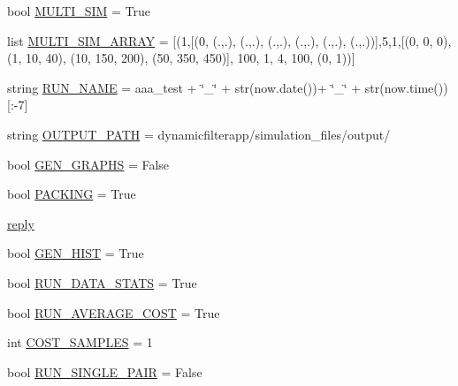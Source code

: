 \begin{DoxyCompactItemize}
\item 
bool \mbox{\hyperlink{namespacedynamicfilterapp_1_1toggles_a8822be27c516d0f027cff60d067b6d87}{M\+U\+L\+T\+I\+\_\+\+S\+IM}} = True
\item 
list \mbox{\hyperlink{namespacedynamicfilterapp_1_1toggles_a220d8cf87bacce3b4d63c494c95b918e}{M\+U\+L\+T\+I\+\_\+\+S\+I\+M\+\_\+\+A\+R\+R\+AY}} = \mbox{[}(1,\mbox{[}(0, (.,.), (.,.), (.,.), (.,.), (.,.), (.,.))\mbox{]},5,1,\mbox{[}(0, 0, 0), (1, 10, 40), (10, 150, 200), (50, 350, 450)\mbox{]}, 100, 1, 4, 100, (0, 1))\mbox{]}
\item 
string \mbox{\hyperlink{namespacedynamicfilterapp_1_1toggles_a1e90a00628c373ad2f7e63b20ba08b9c}{R\+U\+N\+\_\+\+N\+A\+ME}} = \textquotesingle{}aaa\+\_\+test\textquotesingle{} + \char`\"{}\+\_\+\char`\"{} + str(now.\+date())+ \char`\"{}\+\_\+\char`\"{} + str(now.\+time())\mbox{[}\+:-\/7\mbox{]}
\item 
string \mbox{\hyperlink{namespacedynamicfilterapp_1_1toggles_a04644ded1d5e3fc8bd58a411209b7886}{O\+U\+T\+P\+U\+T\+\_\+\+P\+A\+TH}} = \textquotesingle{}dynamicfilterapp/simulation\+\_\+files/output/\textquotesingle{}
\item 
bool \mbox{\hyperlink{namespacedynamicfilterapp_1_1toggles_a57c1e3f291181d680f3ee118fa5c4ab8}{G\+E\+N\+\_\+\+G\+R\+A\+P\+HS}} = False
\item 
bool \mbox{\hyperlink{namespacedynamicfilterapp_1_1toggles_a23735ccf05ebd9212e9ebaab8f652507}{P\+A\+C\+K\+I\+NG}} = True
\item 
\mbox{\hyperlink{namespacedynamicfilterapp_1_1toggles_a496267841b3ab9e872499fd2731736ff}{reply}}
\item 
bool \mbox{\hyperlink{namespacedynamicfilterapp_1_1toggles_a242327c0cdef5981d6e14793e1446957}{G\+E\+N\+\_\+\+H\+I\+ST}} = True
\item 
bool \mbox{\hyperlink{namespacedynamicfilterapp_1_1toggles_a36bc09bc8fbde0df2ea1c5d9ed0cf135}{R\+U\+N\+\_\+\+D\+A\+T\+A\+\_\+\+S\+T\+A\+TS}} = True
\item 
bool \mbox{\hyperlink{namespacedynamicfilterapp_1_1toggles_a21f2f0f4c6df7faefb843dd318af3452}{R\+U\+N\+\_\+\+A\+V\+E\+R\+A\+G\+E\+\_\+\+C\+O\+ST}} = True
\item 
int \mbox{\hyperlink{namespacedynamicfilterapp_1_1toggles_a134ac33ad7706cd6a24fda5b63c73c65}{C\+O\+S\+T\+\_\+\+S\+A\+M\+P\+L\+ES}} = 1
\item 
bool \mbox{\hyperlink{namespacedynamicfilterapp_1_1toggles_ab61137c2de5f99b09789a6e76b7cda4c}{R\+U\+N\+\_\+\+S\+I\+N\+G\+L\+E\+\_\+\+P\+A\+IR}} = False

\end{DoxyCompactItemize}
